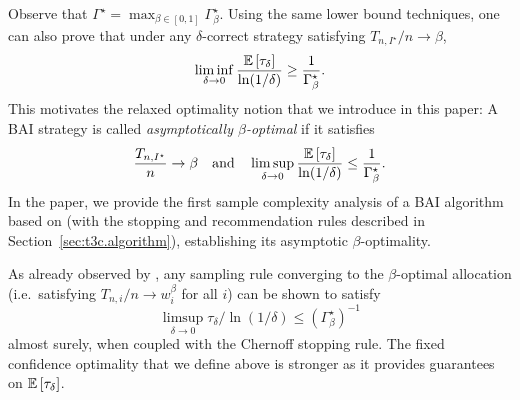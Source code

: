 Observe that $\Gamma^\star = \max_{\beta \in [0,1]} \Gamma_\beta^\star$. Using the same lower bound techniques, one can also prove that under any $\delta$-correct strategy satisfying $T_{n,I^\star}/n \rightarrow \beta$,
\[\liminf_{\delta \rightarrow 0}\frac{\mathbb{E}\left[\tau_\delta\right]}{\ln(1/\delta)} \geq \frac{1}{\Gamma^\star_\beta}.\]
This motivates the relaxed optimality notion that we introduce in this paper: A BAI strategy is called \emph{asymptotically $\beta$-optimal} if it satisfies 
\[\frac{T_{n,I^\star}}{n}\rightarrow \beta \ \ \ \text{and} \ \ \ \limsup_{\delta \rightarrow 0}\frac{\EE{\tau_\delta}}{\ln(1/\delta)} \leq \frac{1}{\Gamma^\star_\beta}.\]
In the paper, we provide the first sample complexity analysis of a BAI algorithm based on \TTTS (with the stopping and recommendation rules described in Section~\ref{sec:t3c.algorithm}), establishing its asymptotic $\beta$-optimality.

As already observed by \cite{qin2017ttei}, any sampling rule converging to the $\beta$-optimal allocation (i.e.\ satisfying $T_{n,i}/n \rightarrow w_i^\beta$ for all $i$) can be shown to satisfy 
\[
    \limsup_{\delta \rightarrow 0} \tau_\delta/\ln(1/\delta) \leq (\Gamma_\beta^\star)^{-1}
\]
almost surely, when coupled with the Chernoff stopping rule. The fixed confidence optimality that we define above is stronger as it provides guarantees on $\mathbb{E}\left[\tau_\delta\right]$.


